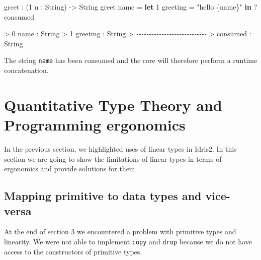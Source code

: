 \documentclass[
]{article}
\newenvironment{Shaded}{}{}
\newcommand{\CommentTok}[1]{\textcolor[rgb]{0.38,0.63,0.69}{\textit{#1}}}
\newcommand{\DataTypeTok}[1]{\textcolor[rgb]{0.56,0.13,0.00}{#1}}
\newcommand{\DecValTok}[1]{\textcolor[rgb]{0.25,0.63,0.44}{#1}}
\newcommand{\KeywordTok}[1]{\textcolor[rgb]{0.00,0.44,0.13}{\textbf{#1}}}
\newcommand{\NormalTok}[1]{#1}
\newcommand{\OperatorTok}[1]{\textcolor[rgb]{0.40,0.40,0.40}{#1}}
\newcommand{\OtherTok}[1]{\textcolor[rgb]{0.00,0.44,0.13}{#1}}
\newcommand{\StringTok}[1]{\textcolor[rgb]{0.25,0.44,0.63}{#1}}
\begin{document}
\begin{Shaded}
\begin{Highlighting}[]
\NormalTok{greet }\OperatorTok{:}\NormalTok{ (}\DecValTok{1}\NormalTok{ n }\OperatorTok{:} \DataTypeTok{String}\NormalTok{) }\OtherTok{{-}\textgreater{}} \DataTypeTok{String}
\NormalTok{greet name }\OtherTok{=} \KeywordTok{let} \DecValTok{1}\NormalTok{ greeting }\OtherTok{=} \StringTok{"hello \{name\}"} \KeywordTok{in} \OperatorTok{?}\NormalTok{consumed}
\end{Highlighting}
\end{Shaded}

\begin{Shaded}
\begin{Highlighting}[]
\OperatorTok{\textgreater{}} \DecValTok{0}\NormalTok{ name }\OperatorTok{:} \DataTypeTok{String}
\OperatorTok{\textgreater{}} \DecValTok{1}\NormalTok{ greeting }\OperatorTok{:} \DataTypeTok{String}
\OperatorTok{\textgreater{}} \CommentTok{{-}{-}{-}{-}{-}{-}{-}{-}{-}{-}{-}{-}{-}{-}{-}{-}{-}{-}{-}{-}{-}{-}{-}{-}{-}{-}{-}{-}}
\OperatorTok{\textgreater{}}\NormalTok{ consumed }\OperatorTok{:} \DataTypeTok{String}
\end{Highlighting}
\end{Shaded}

The string \texttt{name} has been consumed and the core will therefore
perform a runtime concatenation.

\newpage

\hypertarget{quantitative-type-theory-and-programming-ergonomics}{%
\section{Quantitative Type Theory and Programming
ergonomics}\label{quantitative-type-theory-and-programming-ergonomics}}

In the previous section, we highlighted uses of linear types in Idris2.
In this section we are going to show the limitations of linear types in
terms of ergonomics and provide solutions for them.

\hypertarget{mapping-primitive-to-data-types-and-vice-versa}{%
\subsection{Mapping primitive to data types and
vice-versa}\label{mapping-primitive-to-data-types-and-vice-versa}}

At the end of section 3 we encountered a problem with primitive types
and linearity. We were not able to implement \texttt{copy} and
\texttt{drop} because we do not have access to the constructors of
primitive types.
\end{document}
